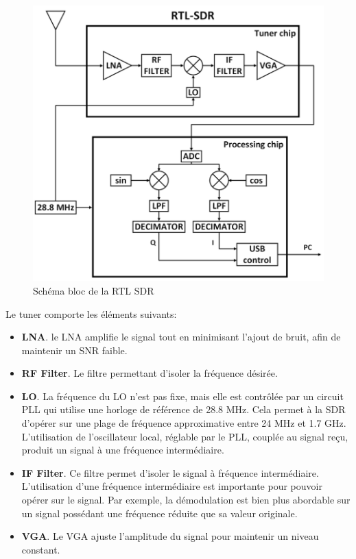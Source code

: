 \newpage

\begin{figure}[h]
\centering

\includegraphics[scale=0.5]{images/SB-rtlsdr.png}
\caption{Schéma bloc de la RTL SDR\cite{SBrtlsdr}}\label{term3000}
\end{figure}


Le tuner comporte les éléments suivants:
\begin{itemize}
\item \textbf{\ac{LNA}}. le \ac{LNA} amplifie le signal tout en minimisant l'ajout de bruit, afin de maintenir un \ac{SNR} faible.
\item \textbf{\ac{RF} Filter}. Le filtre permettant d'isoler la fréquence désirée.
\item \textbf{\ac{LO}}. La fréquence du \ac{LO} n'est pas fixe, mais elle est contrôlée par un circuit \ac{PLL} qui utilise une horloge de référence de 28.8 MHz. Cela permet à la \ac{SDR} d'opérer sur une plage de fréquence approximative entre 24 MHz et 1.7 GHz. L'utilisation de l'oscillateur local, réglable par le \ac{PLL}, couplée au signal reçu, produit un signal à une fréquence intermédiaire.
\item \textbf{\ac{IF} Filter}. Ce filtre permet d'isoler le signal à fréquence intermédiaire. L'utilisation d'une fréquence intermédiaire est importante pour pouvoir opérer sur le signal. Par exemple, la démodu\-lation est bien plus abordable sur un signal possédant une fréquence réduite que sa valeur originale.
\item \textbf{\ac{VGA}}. Le \ac{VGA} ajuste l'amplitude du signal pour maintenir un niveau constant.
\end{itemize}

